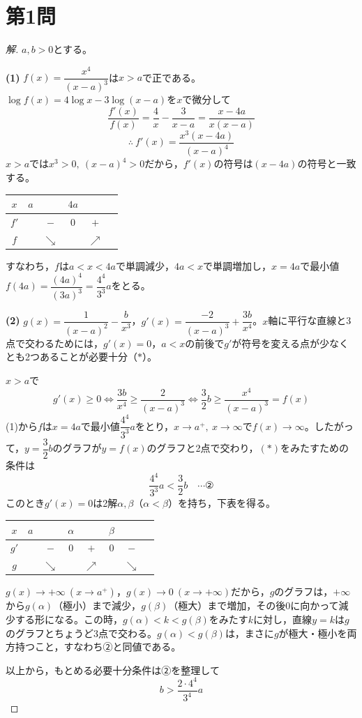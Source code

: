 \documentclass[../main.tex]{subfiles}
\begin{document}
\section*{第1問}

\begin{proof}[解]
  $a,b>0$とする。

  \textbf{(1)} $f(x)=\dfrac{x^4}{(x-a)^3}$は$x>a$で正である。$\log f(x)=4\log x-3\log(x-a)$を$x$で微分して
  \[
    \frac{f'(x)}{f(x)}=\frac4x-\frac3{x-a}=\frac{x-4a}{x(x-a)}
  \]
  \[
    \therefore\ f'(x)=\frac{x^3(x-4a)}{(x-a)^4}
  \]
  $x>a$では$x^3>0,\ (x-a)^4>0$だから，$f'(x)$の符号は$(x-4a)$の符号と一致する。
  \begin{center}
    \begin{tabular}{c|ccccc}
      $x$ & $a$ & & $4a$ & & \\
      \hline
      $f'$ & & $-$ & $0$ & $+$ & \\
      \hline
      $f$ & & $\searrow$ & & $\nearrow$ &
    \end{tabular}
  \end{center}
  すなわち，$f$は$a<x<4a$で単調減少，$4a<x$で単調増加し，$x=4a$で最小値$f(4a)=\dfrac{(4a)^4}{(3a)^3}=\dfrac{4^4}{3^3}a$をとる。

  \textbf{(2)} $g(x)=\dfrac1{(x-a)^2}-\dfrac b{x^3}$，$g'(x)=\dfrac{-2}{(x-a)^3}+\dfrac{3b}{x^4}$。$x$軸に平行な直線と3点で交わるためには，$g'(x)=0$，$a<x$の前後で$g'$が符号を変える点が少なくとも2つあることが必要十分（$*$）。

  $x>a$で
  \[
    g'(x)\ge0 \iff \frac{3b}{x^4}\ge\frac2{(x-a)^3} \iff \frac32b\ge\frac{x^4}{(x-a)^3}=f(x)
  \]
  (1)から$f$は$x=4a$で最小値$\dfrac{4^4}{3^3}a$をとり，$x\to a^+,\ x\to\infty$で$f(x)\to\infty$。したがって，$y=\dfrac32b$のグラフが$y=f(x)$のグラフと2点で交わり，$(*)$をみたすための条件は
  \[
    \frac{4^4}{3^3}a<\frac32b \quad\cdots\text{②}
  \]
  このとき$g'(x)=0$は2解$\alpha,\beta$（$\alpha<\beta$）を持ち，下表を得る。
  \begin{center}
    \begin{tabular}{c|ccccccc}
      $x$ & $a$ & & $\alpha$ & & $\beta$ & & \\
      \hline
      $g'$ & & $-$ & $0$ & $+$ & $0$ & $-$ & \\
      \hline
      $g$ & & $\searrow$ & & $\nearrow$ & & $\searrow$ &
    \end{tabular}
  \end{center}
  $g(x)\to+\infty\ (x\to a^+)$，$g(x)\to0\ (x\to+\infty)$だから，$g$のグラフは，$+\infty$から$g(\alpha)$（極小）まで減少，$g(\beta)$（極大）まで増加，その後$0$に向かって減少する形になる。この時，$g(\alpha)<k<g(\beta)$をみたす$k$に対し，直線$y=k$は$g$のグラフとちょうど3点で交わる。$g(\alpha)<g(\beta)$は，まさに$g$が極大・極小を両方持つこと，すなわち②と同値である。

  以上から，もとめる必要十分条件は②を整理して
  \[
    b>\frac{2\cdot4^4}{3^4}a
  \]
\end{proof}
\end{document}
